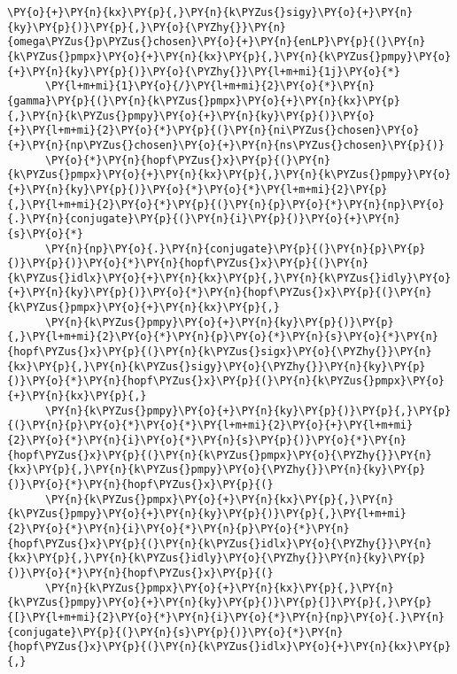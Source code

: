 \begin{Verbatim}[commandchars=\\\{\}]
      \PY{o}{+}\PY{n}{kx}\PY{p}{,}\PY{n}{k\PYZus{}sigy}\PY{o}{+}\PY{n}{ky}\PY{p}{)}\PY{p}{,}\PY{o}{\PYZhy{}}\PY{n}{omega\PYZus{}p\PYZus{}chosen}\PY{o}{+}\PY{n}{enLP}\PY{p}{(}\PY{n}{k\PYZus{}pmpx}\PY{o}{+}\PY{n}{kx}\PY{p}{,}\PY{n}{k\PYZus{}pmpy}\PY{o}{+}\PY{n}{ky}\PY{p}{)}\PY{o}{\PYZhy{}}\PY{l+m+mi}{1j}\PY{o}{*}
      \PY{l+m+mi}{1}\PY{o}{/}\PY{l+m+mi}{2}\PY{o}{*}\PY{n}{gamma}\PY{p}{(}\PY{n}{k\PYZus{}pmpx}\PY{o}{+}\PY{n}{kx}\PY{p}{,}\PY{n}{k\PYZus{}pmpy}\PY{o}{+}\PY{n}{ky}\PY{p}{)}\PY{o}{+}\PY{l+m+mi}{2}\PY{o}{*}\PY{p}{(}\PY{n}{ni\PYZus{}chosen}\PY{o}{+}\PY{n}{np\PYZus{}chosen}\PY{o}{+}\PY{n}{ns\PYZus{}chosen}\PY{p}{)}
      \PY{o}{*}\PY{n}{hopf\PYZus{}x}\PY{p}{(}\PY{n}{k\PYZus{}pmpx}\PY{o}{+}\PY{n}{kx}\PY{p}{,}\PY{n}{k\PYZus{}pmpy}\PY{o}{+}\PY{n}{ky}\PY{p}{)}\PY{o}{*}\PY{o}{*}\PY{l+m+mi}{2}\PY{p}{,}\PY{l+m+mi}{2}\PY{o}{*}\PY{p}{(}\PY{n}{p}\PY{o}{*}\PY{n}{np}\PY{o}{.}\PY{n}{conjugate}\PY{p}{(}\PY{n}{i}\PY{p}{)}\PY{o}{+}\PY{n}{s}\PY{o}{*}
      \PY{n}{np}\PY{o}{.}\PY{n}{conjugate}\PY{p}{(}\PY{n}{p}\PY{p}{)}\PY{p}{)}\PY{o}{*}\PY{n}{hopf\PYZus{}x}\PY{p}{(}\PY{n}{k\PYZus{}idlx}\PY{o}{+}\PY{n}{kx}\PY{p}{,}\PY{n}{k\PYZus{}idly}\PY{o}{+}\PY{n}{ky}\PY{p}{)}\PY{o}{*}\PY{n}{hopf\PYZus{}x}\PY{p}{(}\PY{n}{k\PYZus{}pmpx}\PY{o}{+}\PY{n}{kx}\PY{p}{,}
      \PY{n}{k\PYZus{}pmpy}\PY{o}{+}\PY{n}{ky}\PY{p}{)}\PY{p}{,}\PY{l+m+mi}{2}\PY{o}{*}\PY{n}{p}\PY{o}{*}\PY{n}{s}\PY{o}{*}\PY{n}{hopf\PYZus{}x}\PY{p}{(}\PY{n}{k\PYZus{}sigx}\PY{o}{\PYZhy{}}\PY{n}{kx}\PY{p}{,}\PY{n}{k\PYZus{}sigy}\PY{o}{\PYZhy{}}\PY{n}{ky}\PY{p}{)}\PY{o}{*}\PY{n}{hopf\PYZus{}x}\PY{p}{(}\PY{n}{k\PYZus{}pmpx}\PY{o}{+}\PY{n}{kx}\PY{p}{,}
      \PY{n}{k\PYZus{}pmpy}\PY{o}{+}\PY{n}{ky}\PY{p}{)}\PY{p}{,}\PY{p}{(}\PY{n}{p}\PY{o}{*}\PY{o}{*}\PY{l+m+mi}{2}\PY{o}{+}\PY{l+m+mi}{2}\PY{o}{*}\PY{n}{i}\PY{o}{*}\PY{n}{s}\PY{p}{)}\PY{o}{*}\PY{n}{hopf\PYZus{}x}\PY{p}{(}\PY{n}{k\PYZus{}pmpx}\PY{o}{\PYZhy{}}\PY{n}{kx}\PY{p}{,}\PY{n}{k\PYZus{}pmpy}\PY{o}{\PYZhy{}}\PY{n}{ky}\PY{p}{)}\PY{o}{*}\PY{n}{hopf\PYZus{}x}\PY{p}{(}
      \PY{n}{k\PYZus{}pmpx}\PY{o}{+}\PY{n}{kx}\PY{p}{,}\PY{n}{k\PYZus{}pmpy}\PY{o}{+}\PY{n}{ky}\PY{p}{)}\PY{p}{,}\PY{l+m+mi}{2}\PY{o}{*}\PY{n}{i}\PY{o}{*}\PY{n}{p}\PY{o}{*}\PY{n}{hopf\PYZus{}x}\PY{p}{(}\PY{n}{k\PYZus{}idlx}\PY{o}{\PYZhy{}}\PY{n}{kx}\PY{p}{,}\PY{n}{k\PYZus{}idly}\PY{o}{\PYZhy{}}\PY{n}{ky}\PY{p}{)}\PY{o}{*}\PY{n}{hopf\PYZus{}x}\PY{p}{(}
      \PY{n}{k\PYZus{}pmpx}\PY{o}{+}\PY{n}{kx}\PY{p}{,}\PY{n}{k\PYZus{}pmpy}\PY{o}{+}\PY{n}{ky}\PY{p}{)}\PY{p}{]}\PY{p}{,}\PY{p}{[}\PY{l+m+mi}{2}\PY{o}{*}\PY{n}{i}\PY{o}{*}\PY{n}{np}\PY{o}{.}\PY{n}{conjugate}\PY{p}{(}\PY{n}{s}\PY{p}{)}\PY{o}{*}\PY{n}{hopf\PYZus{}x}\PY{p}{(}\PY{n}{k\PYZus{}idlx}\PY{o}{+}\PY{n}{kx}\PY{p}{,}

\end{Verbatim}
